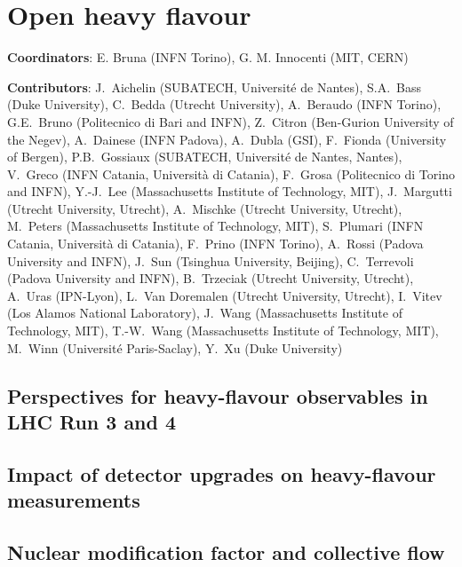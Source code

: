 \documentclass[../report.tex]{subfiles}
\providecommand{\main}{..}
\begin{document}
\clearpage
\section{Open heavy flavour}
\label{sec:HI_HF}

{ \small
\noindent 
\textbf{Coordinators}: E. Bruna (INFN Torino), G. M. Innocenti (MIT, CERN)

\noindent \textbf{Contributors}: 
J.~Aichelin (SUBATECH, Universit\'e de Nantes),
S.A.~Bass (Duke University),
C.~Bedda (Utrecht University),
A.~Beraudo (INFN Torino),
G.E.~Bruno (Politecnico di Bari and INFN), 
Z.~Citron (Ben-Gurion University of the Negev),
A.~Dainese (INFN Padova),
A.~Dubla (GSI),
F.~Fionda (University of Bergen),
P.B.~Gossiaux (SUBATECH, Universit\'e de Nantes, Nantes),
V.~Greco (INFN Catania, Universit\`a di Catania),
F.~Grosa (Politecnico di Torino and INFN),
Y.-J.~Lee (Massachusetts Institute of Technology, MIT),
J.~Margutti (Utrecht University, Utrecht),
A.~Mischke (Utrecht University, Utrecht),
M.~Peters (Massachusetts Institute of Technology, MIT),
S.~Plumari (INFN Catania, Universit\`a di Catania),
F.~Prino (INFN Torino),
A.~Rossi (Padova University and INFN),
J.~Sun (Tsinghua University, Beijing),
C.~Terrevoli (Padova University and INFN),
B.~Trzeciak (Utrecht University, Utrecht),
A.~Uras (IPN-Lyon),
L.~Van Doremalen (Utrecht University, Utrecht),
I.~Vitev (Los Alamos National Laboratory),
J.~Wang (Massachusetts Institute of Technology, MIT),
T.-W.~Wang (Massachusetts Institute of Technology, MIT),
M.~Winn (Universit\'e Paris-Saclay),
Y.~Xu (Duke University)
}




\subsection{Perspectives for heavy-flavour observables in LHC Run 3 and 4}


\subsection{Impact of detector upgrades on heavy-flavour measurements}


\subsection{Nuclear modification factor and collective flow}

\end{document}

